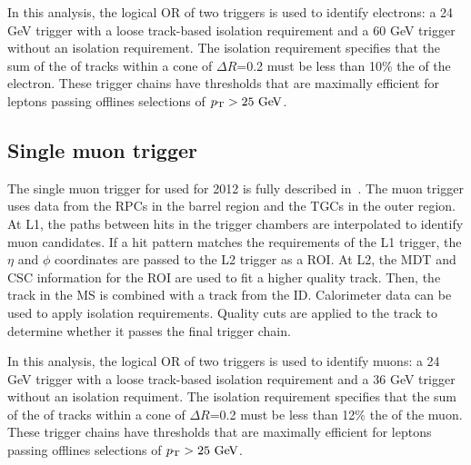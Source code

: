 In this analysis, the logical OR of two triggers is used to identify electrons: a 24 GeV trigger with a loose track-based isolation requirement and a 60 GeV trigger without an isolation requirement. The isolation requirement specifies that the sum of the \pt of tracks within a cone of $\Delta R$=0.2 must be less than 10\% the \pt of the electron. These trigger chains have thresholds that are maximally efficient for leptons passing offlines selections of $\pT > 25 \GeV$.

\subsection{Single muon trigger}

The single muon trigger for used for 2012 is fully described in~\cite{mutrig}. The muon trigger uses data from the RPCs in the barrel region and the TGCs in the outer region. At L1, the paths between hits in the trigger chambers are interpolated to identify muon candidates. If a hit pattern matches the requirements of the L1 trigger, the $\eta$ and $\phi$ coordinates are passed to the L2 trigger as a ROI. At L2, the MDT and CSC information for the ROI are used to fit a higher quality track. Then, the track in the MS is combined with a track from the ID. Calorimeter data can be used to apply isolation requirements. Quality cuts are applied to the track to determine whether it passes the final trigger chain.

In this analysis, the logical OR of two triggers is used to identify muons: a 24 GeV trigger with a loose track-based isolation requirement and a 36 GeV trigger without an isolation requiment. The isolation requirement specifies that the sum of the \pt of tracks within a cone of $\Delta R$=0.2 must be less than 12\% the \pt of the muon. These trigger chains have thresholds that are maximally efficient for leptons passing offlines selections of $\pT > 25 \GeV$.

